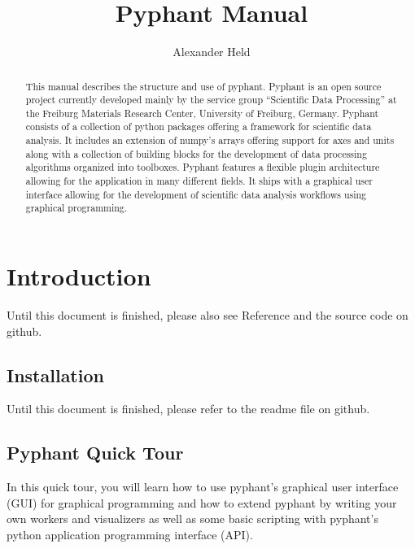 \documentclass[a4paper]{article}
\begin{document}
\title{Pyphant Manual}
\author{Alexander Held}

\maketitle

\date{}

\begin{abstract}
  This manual describes the structure and use of
  pyphant. Pyphant is an open source project
  currently developed mainly by the service group ``Scientific Data
  Processing'' at the Freiburg Materials Research Center, University
  of Freiburg, Germany. Pyphant consists of a collection of python
  packages offering a framework for scientific data analysis. It
  includes an extension of numpy's arrays offering
  support for axes and units along with a collection of building
  blocks for the development of data processing algorithms organized
  into toolboxes. Pyphant features a flexible plugin architecture
  allowing for the application in many different fields. It ships with
  a graphical user interface allowing for the development of
  scientific data analysis workflows using graphical programming.
\end{abstract}

\tableofcontents

\section{Introduction}
\label{sec:introduction}

Until this document is finished, please also see
Reference\cite{pyphant} and the source code on
github\cite{pyphanturl}.

\subsection{Installation}
\label{sec:introduction_installation}

Until this document is finished, please refer to the readme file on
github\cite{pyphanturl}.

\subsection{Pyphant Quick Tour}
\label{sec:introduction_a_quick_tour}

In this quick tour, you will learn how to use pyphant's graphical user
interface (GUI) for graphical programming and how to extend pyphant by
writing your own workers and visualizers as well as some basic
scripting with pyphant's python application programming interface
(API).
\end{document}
